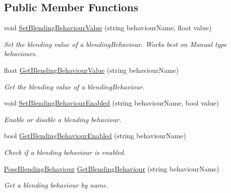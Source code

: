 \subsection*{Public Member Functions}
\begin{DoxyCompactItemize}
\item 
void \mbox{\hyperlink{class_valve_1_1_v_r_1_1_steam_v_r___skeleton___poser_aa78aff2ee1050b6b9d1e75fcdba716de}{Set\+Blending\+Behaviour\+Value}} (string behaviour\+Name, float value)
\begin{DoxyCompactList}\small\item\em Set the blending value of a blending\+Behaviour. Works best on Manual type behaviours. \end{DoxyCompactList}\item 
float \mbox{\hyperlink{class_valve_1_1_v_r_1_1_steam_v_r___skeleton___poser_a7e788c608463b075fb08a1ac5971f14d}{Get\+Blending\+Behaviour\+Value}} (string behaviour\+Name)
\begin{DoxyCompactList}\small\item\em Get the blending value of a blending\+Behaviour. \end{DoxyCompactList}\item 
void \mbox{\hyperlink{class_valve_1_1_v_r_1_1_steam_v_r___skeleton___poser_a9ffcecfe8838cd4b5d9b2d28e990c8b6}{Set\+Blending\+Behaviour\+Enabled}} (string behaviour\+Name, bool value)
\begin{DoxyCompactList}\small\item\em Enable or disable a blending behaviour. \end{DoxyCompactList}\item 
bool \mbox{\hyperlink{class_valve_1_1_v_r_1_1_steam_v_r___skeleton___poser_a450ef2915c0515576353689fad3ad3b7}{Get\+Blending\+Behaviour\+Enabled}} (string behaviour\+Name)
\begin{DoxyCompactList}\small\item\em Check if a blending behaviour is enabled. \end{DoxyCompactList}\item 
\mbox{\hyperlink{class_valve_1_1_v_r_1_1_steam_v_r___skeleton___poser_1_1_pose_blending_behaviour}{Pose\+Blending\+Behaviour}} \mbox{\hyperlink{class_valve_1_1_v_r_1_1_steam_v_r___skeleton___poser_a1d908654738a4881221dc68fad3e8f4f}{Get\+Blending\+Behaviour}} (string behaviour\+Name)
\begin{DoxyCompactList}\small\item\em Get a blending behaviour by name. \end{DoxyCompactList}\item 

\end{DoxyCompactItemize}
